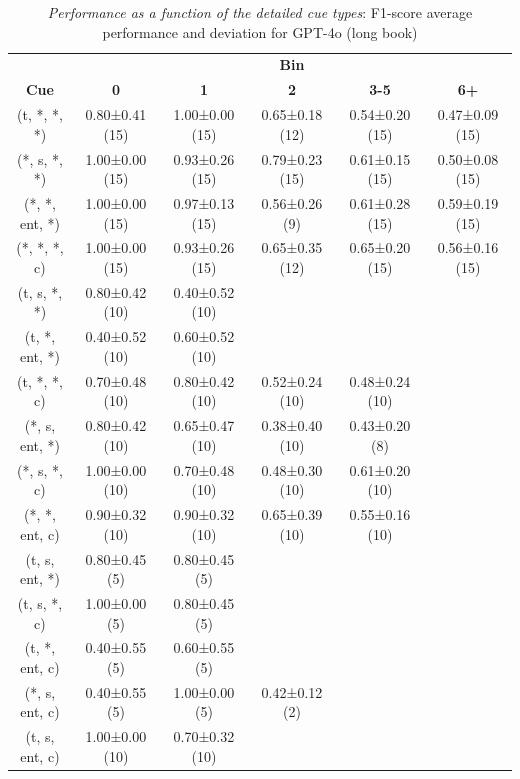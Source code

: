 \documentclass{article}
\begin{document}
\begin{table}[h]
\centering
\caption{\textit{Performance as a function of the detailed cue types}: F1-score average performance and deviation for GPT-4o (long book)}
\label{tab:result_cue_bin_detailed}
\begin{tabular}{@{}cccccc@{}}
\toprule
& \multicolumn{5}{c}{\bf Bin} \\
\bf Cue   & \textbf{0} & \textbf{1} & \textbf{2} & \textbf{3-5} & \textbf{6+} \\ \midrule
(t, *, *, *) & 0.80±0.41 (15) & 1.00±0.00 (15) & 0.65±0.18 (12) & 0.54±0.20 (15) & 0.47±0.09 (15)\\
(*, s, *, *) & 1.00±0.00 (15) & 0.93±0.26 (15) & 0.79±0.23 (15) & 0.61±0.15 (15) & 0.50±0.08 (15)\\
(*, *, ent, *) & 1.00±0.00 (15) &  0.97±0.13 (15) & 0.56±0.26 (9) & 0.61±0.28 (15) & 0.59±0.19 (15) \\
(*, *, *, c) & 1.00±0.00 (15) & 0.93±0.26 (15) & 0.65±0.35 (12) & 0.65±0.20 (15) & 0.56±0.16 (15) \\
(t, s, *, *) & 0.80±0.42 (10) & 0.40±0.52 (10) &  &  &  \\
(t, *, ent, *) & 0.40±0.52 (10) & 0.60±0.52 (10) &  &  &  \\
(t, *, *, c) & 0.70±0.48 (10) & 0.80±0.42 (10) & 0.52±0.24 (10) & 0.48±0.24 (10) &  \\
(*, s, ent, *) & 0.80±0.42 (10) & 0.65±0.47 (10) & 0.38±0.40 (10) & 0.43±0.20 (8) &  \\

(*, s, *, c) & 1.00±0.00 (10) & 0.70±0.48 (10) & 0.48±0.30 (10) & 0.61±0.20 (10) &  \\
(*, *, ent, c) & 0.90±0.32 (10) & 0.90±0.32 (10) & 0.65±0.39 (10) & 0.55±0.16 (10) &  \\
(t, s, ent, *) & 0.80±0.45 (5) & 0.80±0.45 (5) &  &  &  \\
(t, s, *, c) & 1.00±0.00 (5) & 0.80±0.45 (5) &  &  &  \\
(t, *, ent, c) & 0.40±0.55 (5) & 0.60±0.55 (5) &  &  &  \\
(*, s, ent, c) & 0.40±0.55 (5) & 1.00±0.00 (5) & 0.42±0.12 (2)  &  &  \\
(t, s, ent, c) & 1.00±0.00 (10) & 0.70±0.32 (10) &  &  &  \\ \bottomrule
\end{tabular}
\end{table}
\end{document}
